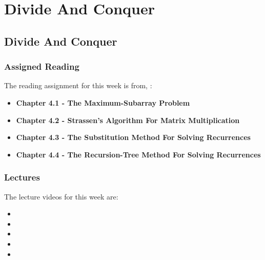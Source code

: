 \clearpage

\renewcommand{\ChapTitle}{Divide And Conquer}
\renewcommand{\SectionTitle}{Divide And Conquer}

\chapter{\ChapTitle}
\section{\SectionTitle}

\subsection{Assigned Reading}

The reading assignment for this week is from, \Textbook:

\begin{itemize}
    \item \textbf{Chapter 4.1 - The Maximum-Subarray Problem}
    \item \textbf{Chapter 4.2 - Strassen's Algorithm For Matrix Multiplication}
    \item \textbf{Chapter 4.3 - The Substitution Method For Solving Recurrences}
    \item \textbf{Chapter 4.4 - The Recursion-Tree Method For Solving Recurrences}
\end{itemize}

\subsection{Lectures}

The lecture videos for this week are:

\begin{itemize}
    \item {}
    \item {}
    \item {}
    \item {}
    \item {}
\end{itemize}

